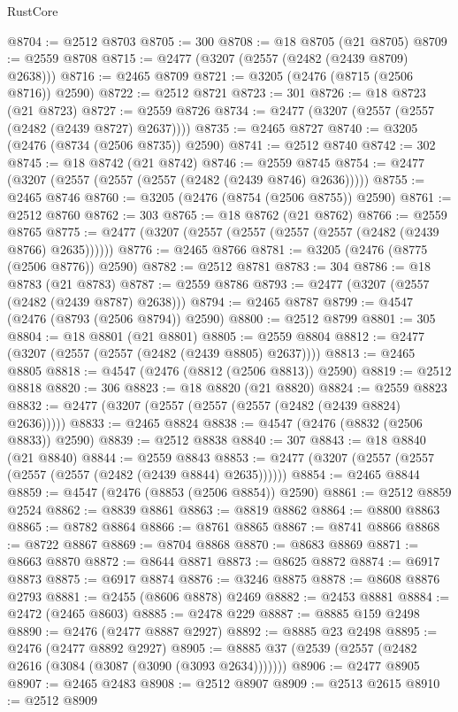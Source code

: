 \begin{lexlean}{RustCore}
\begin{coremodule}
@8704 := @2512 @8703
@8705 := 300
@8708 := @18 @8705 (@21 @8705)
@8709 := @2559 @8708
@8715 := @2477 (@3207 (@2557 (@2482 (@2439 @8709) @2638)))
@8716 := @2465 @8709
@8721 := @3205 (@2476 (@8715 (@2506 @8716)) @2590)
@8722 := @2512 @8721
@8723 := 301
@8726 := @18 @8723 (@21 @8723)
@8727 := @2559 @8726
@8734 := @2477 (@3207 (@2557 (@2557 (@2482 (@2439 @8727) @2637))))
@8735 := @2465 @8727
@8740 := @3205 (@2476 (@8734 (@2506 @8735)) @2590)
@8741 := @2512 @8740
@8742 := 302
@8745 := @18 @8742 (@21 @8742)
@8746 := @2559 @8745
@8754 := @2477 (@3207 (@2557 (@2557 (@2557 (@2482 (@2439 @8746) @2636)))))
@8755 := @2465 @8746
@8760 := @3205 (@2476 (@8754 (@2506 @8755)) @2590)
@8761 := @2512 @8760
@8762 := 303
@8765 := @18 @8762 (@21 @8762)
@8766 := @2559 @8765
@8775 := @2477 (@3207 (@2557 (@2557 (@2557 (@2557 (@2482 (@2439 @8766) @2635))))))
@8776 := @2465 @8766
@8781 := @3205 (@2476 (@8775 (@2506 @8776)) @2590)
@8782 := @2512 @8781
@8783 := 304
@8786 := @18 @8783 (@21 @8783)
@8787 := @2559 @8786
@8793 := @2477 (@3207 (@2557 (@2482 (@2439 @8787) @2638)))
@8794 := @2465 @8787
@8799 := @4547 (@2476 (@8793 (@2506 @8794)) @2590)
@8800 := @2512 @8799
@8801 := 305
@8804 := @18 @8801 (@21 @8801)
@8805 := @2559 @8804
@8812 := @2477 (@3207 (@2557 (@2557 (@2482 (@2439 @8805) @2637))))
@8813 := @2465 @8805
@8818 := @4547 (@2476 (@8812 (@2506 @8813)) @2590)
@8819 := @2512 @8818
@8820 := 306
@8823 := @18 @8820 (@21 @8820)
@8824 := @2559 @8823
@8832 := @2477 (@3207 (@2557 (@2557 (@2557 (@2482 (@2439 @8824) @2636)))))
@8833 := @2465 @8824
@8838 := @4547 (@2476 (@8832 (@2506 @8833)) @2590)
@8839 := @2512 @8838
@8840 := 307
@8843 := @18 @8840 (@21 @8840)
@8844 := @2559 @8843
@8853 := @2477 (@3207 (@2557 (@2557 (@2557 (@2557 (@2482 (@2439 @8844) @2635))))))
@8854 := @2465 @8844
@8859 := @4547 (@2476 (@8853 (@2506 @8854)) @2590)
@8861 := @2512 @8859 @2524
@8862 := @8839 @8861
@8863 := @8819 @8862
@8864 := @8800 @8863
@8865 := @8782 @8864
@8866 := @8761 @8865
@8867 := @8741 @8866
@8868 := @8722 @8867
@8869 := @8704 @8868
@8870 := @8683 @8869
@8871 := @8663 @8870
@8872 := @8644 @8871
@8873 := @8625 @8872
@8874 := @6917 @8873
@8875 := @6917 @8874
@8876 := @3246 @8875
@8878 := @8608 @8876 @2793
@8881 := @2455 (@8606 @8878) @2469
@8882 := @2453 @8881
@8884 := @2472 (@2465 @8603)
@8885 := @2478 @229
@8887 := @8885 @159 @2498
@8890 := @2476 (@2477 @8887 @2927)
@8892 := @8885 @23 @2498
@8895 := @2476 (@2477 @8892 @2927)
@8905 := @8885 @37 (@2539 (@2557 (@2482 @2616 (@3084 (@3087 (@3090 (@3093 @2634)))))))
@8906 := @2477 @8905
@8907 := @2465 @2483
@8908 := @2512 @8907
@8909 := @2513 @2615
@8910 := @2512 @8909

\end{coremodule}
\end{lexlean}
